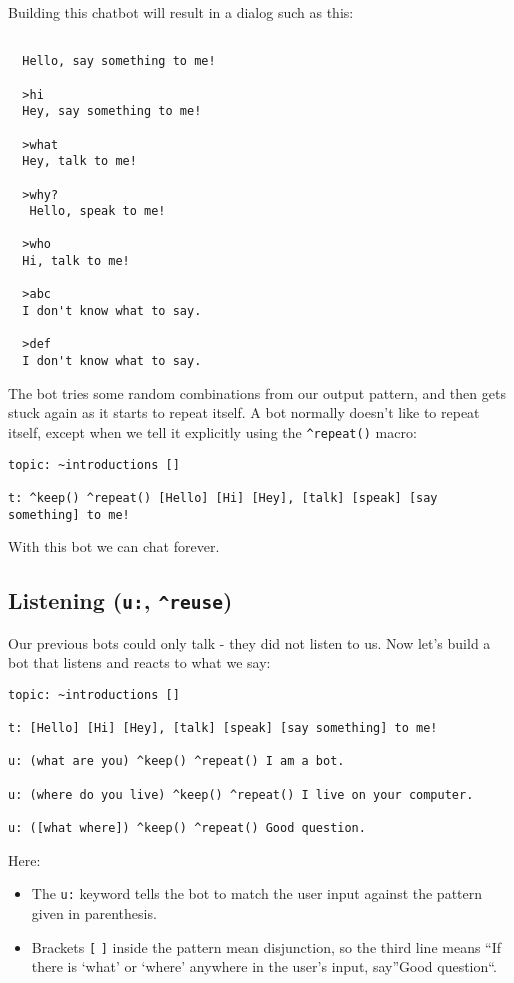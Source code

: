 \documentclass[]{article}
\providecommand{\tightlist}{%
  \setlength{\itemsep}{0pt}\setlength{\parskip}{0pt}}
\begin{document}
Building this chatbot will result in a dialog such as this:

\begin{verbatim}

  Hello, say something to me!

  >hi
  Hey, say something to me!

  >what
  Hey, talk to me!

  >why?
   Hello, speak to me!

  >who
  Hi, talk to me!

  >abc
  I don't know what to say.

  >def
  I don't know what to say.
\end{verbatim}

The bot tries some random combinations from our output pattern, and then
gets stuck again as it starts to repeat itself. A bot normally doesn't
like to repeat itself, except when we tell it explicitly using the
\texttt{\^{}repeat()} macro:

\begin{verbatim}
topic: ~introductions []

t: ^keep() ^repeat() [Hello] [Hi] [Hey], [talk] [speak] [say something] to me!
\end{verbatim}

With this bot we can chat forever.

\subsection{\texorpdfstring{Listening (\texttt{u:},
\texttt{\^{}reuse})}{Listening (u:, \^{}reuse)}}\label{listening-u-reuse}

Our previous bots could only talk - they did not listen to us. Now let's
build a bot that listens and reacts to what we say:

\begin{verbatim}
topic: ~introductions []

t: [Hello] [Hi] [Hey], [talk] [speak] [say something] to me!

u: (what are you) ^keep() ^repeat() I am a bot.

u: (where do you live) ^keep() ^repeat() I live on your computer.

u: ([what where]) ^keep() ^repeat() Good question.
\end{verbatim}

Here:

\begin{itemize}
\tightlist
\item
  The \texttt{u:} keyword tells the bot to match the user input against
  the pattern given in parenthesis.
\item
  Brackets \texttt{{[}} \texttt{{]}} inside the pattern mean
  disjunction, so the third line means ``If there is `what' or `where'
  anywhere in the user's input, say''Good question``.
\end{itemize}
\end{document}

